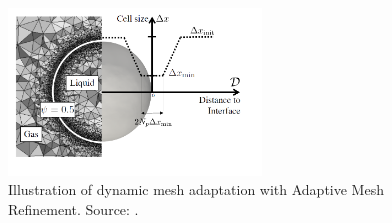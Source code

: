 \begin{figure}[ht]
    \centering
    \includegraphics[width=0.6\textwidth]{./part1_numerical_approaches/figures_ch2/AMR}
       \centering
    \caption[Illustration of dynamic mesh adaptation with Adaptive Mesh Refinement]{Illustration of dynamic mesh adaptation with Adaptive Mesh Refinement. Source: .}
    \label{fig:AMR_strategy}
\end{figure}
%
%
%
%
%
%
%
%
%




